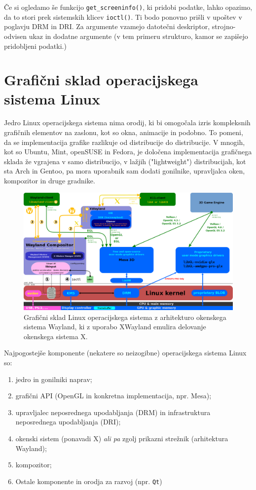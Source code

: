 \documentclass{article}
\begin{document}
Če si ogledamo še funkcijo \texttt{get_screeninfo()}, ki pridobi podatke, lahko opazimo, da to stori prek sistemskih klicev \texttt{ioctl()}. Ti bodo ponovno prišli v upoštev v poglavju DRM in DRI. Za argumente vzamejo datotečni deskriptor, strojno-odvisen ukaz in dodatne argumente (v tem primeru strukturo, kamor se zapišejo pridobljeni podatki.)

\section{Grafični sklad operacijskega sistema Linux}

Jedro Linux operacijskega sistema nima orodij, ki bi omogočala izris kompleksnih grafičnih elementov na zaslonu, kot so okna, animacije in podobno. To pomeni, da se implementacija grafike razlikuje od distribucije do distribucije. V mnogih, kot so Ubuntu, Mint, openSUSE in Fedora, je določena implementacija grafičnega sklada že vgrajena v samo distribucijo, v lažjih ("lightweight") distribucijah, kot sta Arch in Gentoo, pa mora uporabnik sam dodati gonilnike, upravljalca oken, kompozitor in druge gradnike.

\begin{figure}[H]
    \centering
    \includegraphics[width=0.9\linewidth]{glamor}
    \caption{Grafični sklad Linux operacijskega sistema z arhitekturo okenskega sistema Wayland, ki z uporabo XWayland emulira delovanje okenskega sistema X. \autocite{fig:graphicsstack}}
\end{figure}

Najpogostejše komponente (nekatere so neizogibne) operacijskega sistema Linux so: \autocite{baeldunggui}

\begin{enumerate}
    \item jedro in gonilniki naprav;
    \item grafični API (OpenGL in konkretna implementacija, npr. Mesa);
    \item upravljalec neposrednega upodabljanja (DRM) in infrastruktura neposrednega upodabljanja (DRI);
    \item okenski sistem (ponavadi X) \textit{ali pa} zgolj prikazni strežnik (arhitektura Wayland);
    \item kompozitor;
    \item Ostale komponente in orodja za razvoj (npr. \texttt{Qt})
\end{enumerate}
\end{document}
